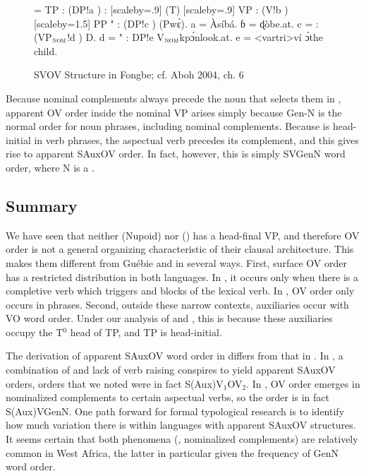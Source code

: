 \documentclass[output=paper,newtxmath,modfonts,nonflat,draftmode]{langsci/langscibook}
\begin{document}
\begin{figure}
{\footnotesize \jtree[xunit=2.5em,yunit=1.25em]
\! = {TP}
: ({DP}!a )
: [scaleby=.9] ({T}) [scaleby=.9] {VP}
: ({V}!b ) [scaleby=1.5] {PP}
"{} : ({DP}!c ) ({P}{{w{\`ɛ}}}).
\!a = {Àsíbá}.
ɓ = {{ɖò}}{be.at}.
\!c = : ({VP$_{\textsc{nom}}$}!d ) {D}.
\!d = "{} : {DP}!e  {V$_{\textsc{nom}}$}{{kp{\'ɔ}n}}{look.at}.
\!e = <vartri>{ví {\'ɔ}}{the child}.
\endjtree}
\caption{SVOV Structure in Fongbe; cf. Aboh 2004, ch. 6}
\label{fig:sande:Fongbe-SVOV}
\end{figure}

Because nominal complements always precede the noun that selects them in  , apparent OV order inside the nominal VP arises simply because Gen-N is the normal order for noun phrases, including nominal complements. Because  is head-initial in verb phrases, the aspectual verb precedes its complement, and this gives rise to apparent SAuxOV order. In fact, however, this is simply SVGenN word order, where N is a .

\subsection{Summary}

We have seen that neither  (Nupoid) nor  () has a head-final VP, and therefore OV order is not a general organizing characteristic of their clausal architecture. This makes them different from Guébie and  in several ways. First, surface OV order has a restricted distribution in both languages. In , it occurs only when there is a completive verb which triggers  and blocks  of the lexical verb. In , OV order only occurs in  phrases. Second, outside these narrow contexts, auxiliaries occur with VO word order. Under our analysis of  and , this is because these auxiliaries occupy the T$^0$ head of TP, and TP is head-initial.

The derivation of apparent SAuxOV word order in  differs from that in . In , a combination of  and lack of verb raising conspires to yield apparent SAuxOV orders, orders that we noted were in fact S(Aux)V$_1$OV$_2$. In , OV order emerges in nominalized complements to certain aspectual verbs, so the  order is in fact S(Aux)VGenN. One path forward for formal typological research is to identify how much variation there is within languages with apparent SAuxOV structures. It seems certain that both phenomena (, nominalized complements) are relatively common in West Africa, the latter in particular given the frequency of GenN word order.
\end{document}
